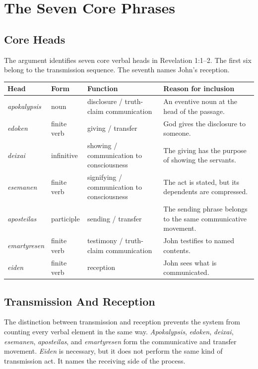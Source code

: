\chapter{The Seven Core Phrases}

\section{Core Heads}

The argument identifies seven core verbal heads in Revelation 1:1--2. The first six belong to the transmission sequence. The seventh names John's reception.

\begin{center}
\begin{longtable}{@{}L{0.16\textwidth}L{0.2\textwidth}L{0.22\textwidth}L{0.3\textwidth}@{}}
\toprule
Head & Form & Function & Reason for inclusion \\
\midrule
\textit{apokalypsis} & noun & disclosure / truth-claim communication & An eventive noun at the head of the passage. \\
\textit{edoken} & finite verb & giving / transfer & God gives the disclosure to someone. \\
\textit{deixai} & infinitive & showing / communication to consciousness & The giving has the purpose of showing the servants. \\
\textit{esemanen} & finite verb & signifying / communication to consciousness & The act is stated, but its dependents are compressed. \\
\textit{aposteilas} & participle & sending / transfer & The sending phrase belongs to the same communicative movement. \\
\textit{emartyresen} & finite verb & testimony / truth-claim communication & John testifies to named contents. \\
\textit{eiden} & finite verb & reception & John sees what is communicated. \\
\bottomrule
\end{longtable}
\end{center}

\section{Transmission And Reception}

The distinction between transmission and reception prevents the system from counting every verbal element in the same way. \textit{Apokalypsis}, \textit{edoken}, \textit{deixai}, \textit{esemanen}, \textit{aposteilas}, and \textit{emartyresen} form the communicative and transfer movement. \textit{Eiden} is necessary, but it does not perform the same kind of transmission act. It names the receiving side of the process.

